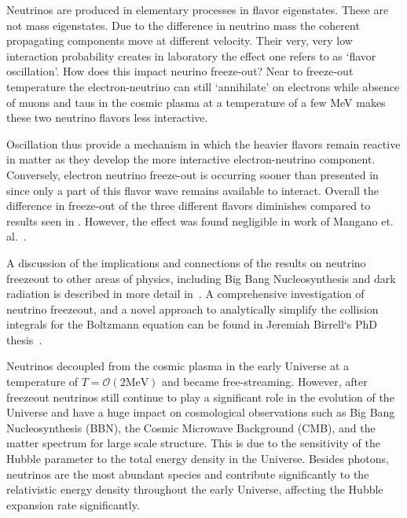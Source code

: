 Neutrinos are produced in elementary processes in flavor eigenstates. These are not mass eigenstates. Due to the difference in neutrino mass the coherent propagating components move at different velocity. Their very, very low interaction probability creates in laboratory the effect one refers to as `flavor oscillation'. How does this impact neurino freeze-out? Near to freeze-out temperature the electron-neutrino can still `annihilate' on electrons while absence of muons and taus in the cosmic plasma at a temperature of a few MeV makes these two neutrino flavors less interactive. 

Oscillation thus provide a mechanism in which the heavier flavors remain reactive in matter as they develop the more interactive electron-neutrino component. Conversely, electron neutrino freeze-out is occurring sooner than presented in  since only a part of this flavor wave remains available to interact. Overall the difference in freeze-out of the three different flavors diminishes compared to results seen in . However, the effect was found negligible in work of Mangano et. al.~\cite{Mangano:2005cc}.

A discussion of the implications and connections of the results on neutrino freezeout to other areas of physics, including Big Bang Nucleosynthesis and dark radiation is described in more detail in~\cite{Dreiner:2011fp,Boehm:2012gr,Blennow:2012de,Birrell:2014uka}. A comprehensive investigation of neutrino freezeout, and a novel approach to analytically simplify the collision integrals for the Boltzmann equation can be found in Jeremiah Birrell‘s PhD thesis~\cite{Birrell:2014ona}. 

\label{sec:N_eff_intro}

Neutrinos decoupled from the cosmic plasma in the early Universe at a temperature of $T=\mathcal{O}(2\mathrm{MeV})$ and became free-streaming. However, after freezeout neutrinos still continue to play a significant role in the evolution of the Universe and have a huge impact on cosmological observations such as Big Bang Nucleosynthesis (BBN), the Cosmic Microwave Background (CMB), and the matter spectrum for large scale structure. This is due to the sensitivity of the Hubble parameter to the total energy density in the Universe. Besides photons, neutrinos are the most abundant species and contribute significantly to the relativistic energy density throughout the early Universe, affecting the Hubble expansion rate significantly. 

